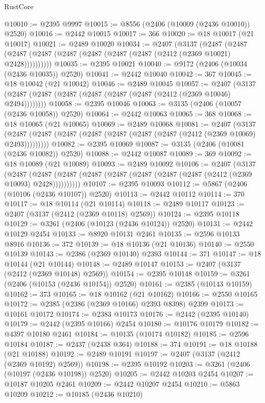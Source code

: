 \begin{lexlean}{RustCore}
\begin{coremodule}
@10010 := @2395 @9997
@10015 := @8556 (@2406 (@10009 (@2436 @10010)) @2520)
@10016 := @2442 @10015
@10017 := 366
@10020 := @18 @10017 (@21 @10017)
@10021 := @2489 @10020
@10034 := @2407
    (@3137
      (@2487 (@2487 (@2487 (@2487 (@2487 (@2487 (@2487 (@2487 (@2412 (@2369 @10021) @2428))))))))))
@10035 := @2395 @10021
@10040 := @9172 (@2406 (@10034 (@2436 @10035)) @2520)
@10041 := @2442 @10040
@10042 := 367
@10045 := @18 @10042 (@21 @10042)
@10046 := @2489 @10045
@10057 := @2407 (@3137 (@2487 (@2487 (@2487 (@2487 (@2487 (@2487 (@2412 (@2369 @10046) @2494))))))))
@10058 := @2395 @10046
@10063 := @3135 (@2406 (@10057 (@2436 @10058)) @2520)
@10064 := @2442 @10063
@10065 := 368
@10068 := @18 @10065 (@21 @10065)
@10069 := @2489 @10068
@10081 := @2407
    (@3137 (@2487 (@2487 (@2487 (@2487 (@2487 (@2487 (@2487 (@2412 (@2369 @10069) @2493)))))))))
@10082 := @2395 @10069
@10087 := @3135 (@2406 (@10081 (@2436 @10082)) @2520)
@10088 := @2442 @10087
@10089 := 369
@10092 := @18 @10089 (@21 @10089)
@10093 := @2489 @10092
@10106 := @2407
    (@3137
      (@2487 (@2487 (@2487 (@2487 (@2487 (@2487 (@2487 (@2487 (@2412 (@2369 @10093) @2428))))))))))
@10107 := @2395 @10093
@10112 := @5867 (@2406 (@10106 (@2436 @10107)) @2520)
@10113 := @2442 @10112
@10114 := 370
@10117 := @18 @10114 (@21 @10114)
@10118 := @2489 @10117
@10123 := @2407 (@3137 (@2412 (@2369 @10118) @2569))
@10124 := @2395 @10118
@10129 := @3261 (@2406 (@10123 (@2436 @10124)) @2520)
@10131 := @2442 @10129 @2454
@10133 := @8920 @10131 @2461
@10135 := @2596 @10133 @8916
@10136 := 372
@10139 := @18 @10136 (@21 @10136)
@10140 := @2550 @10139
@10143 := @2386 (@2369 @10140) @2393
@10144 := 371
@10147 := @18 @10144 (@21 @10144)
@10148 := @2489 @10147
@10153 := @2407 (@3137 (@2412 (@2369 @10148) @2569))
@10154 := @2395 @10148
@10159 := @3261 (@2406 (@10153 (@2436 @10154)) @2520)
@10161 := @2385 (@10143 @10159)
@10162 := 373
@10165 := @18 @10162 (@21 @10162)
@10166 := @2550 @10165
@10172 := @2385 (@2386 (@2369 @10166) @2393 @8398) @2399
@10173 := @10161 @10172
@10174 := @2383 @10173
@10176 := @2442 (@2395 @10140)
@10179 := @2442 (@2395 @10166) @2454
@10180 := @10176 @10179
@10182 := @4397 @10180 @2461
@10184 := @10135 (@10174 @10182)
@10185 := @2596 @10184
@10187 := @2437 (@2438 @364)
@10188 := 374
@10191 := @18 @10188 (@21 @10188)
@10192 := @2489 @10191
@10197 := @2407 (@3137 (@2412 (@2369 @10192) @2569))
@10198 := @2395 @10192
@10203 := @3261 (@2406 (@10197 (@2436 @10198)) @2520)
@10205 := @2442 @10203 @2454
@10207 := @10187 @10205 @2461
@10209 := @2442 @10207 @2454
@10210 := @5863 @10209
@10212 := @10185 (@2436 @10210)

\end{coremodule}
\end{lexlean}
